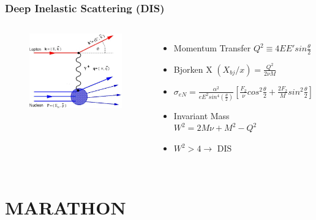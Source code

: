 \documentclass{beamer}
\begin{document}
\begin{frame}
\frametitle{Deep Inelastic Scattering (DIS)}
\begin{columns}[c] %
	
	\begin{figure}
		\includegraphics[width =5cm]{../images/DIS}
	\end{figure}
		
	
	\begin{itemize}
		\item Momentum Transfer $ Q^2 \equiv 4EE' sin \frac{\theta}{2} $
		\item Bjorken X $(X_{bj}/x) = \frac{Q^2}{2\nu M}$
		\item $\sigma_{eN} = \frac{\alpha^2}{eE^2sin^4(\frac{\theta}{2})} [\frac{F_2}{\nu}cos^2\frac{\theta}{2} + \frac{2F_2}{M}sin^2\frac{\theta}{2}] $
		\item Invariant Mass $W^2 = 2M\nu + M^2 - Q^2$
		\item $W^2 > 4 \rightarrow$ DIS
	\end{itemize}
	

	
\end{columns}
\end{frame}

\section[A=3]{MARATHON}
\end{document}
